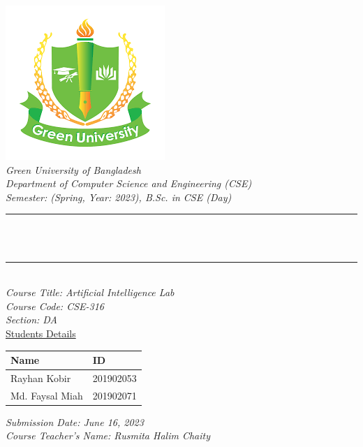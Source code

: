 \begin{titlepage}
\center 
\newcommand{\HRule}{\rule{\linewidth}{0.1mm}}
\includegraphics[scale=0.6]{images/GUB.png}\\[1cm] 
\center 
\textsl{\Large Green University of Bangladesh }\\[0.5cm] 
\textsl{\large Department of Computer Science and Engineering (CSE)}\\
\textsl{\large Semester: (Spring, Year: 2023), B.Sc. in CSE (Day)}\\[0.5cm] 
\makeatletter
\HRule \\[0.4cm]
{ \huge \bfseries \@title}\\[0.2cm] 
\HRule \\[1.0cm]

\textsl{\large Course Title: Artificial Intelligence Lab }\\
\textsl{\large Course Code: CSE-316 }\\ 
\textsl{\large Section: DA}\\[0.5cm] 

{\large \underline{Students Details}}\\[0.2cm]

\begin{table}[htb]
\centering
\begin{tabular}{ |P{7.0cm}|P{3.5cm}|}
\hline
\textbf{Name} & \textbf{ID}\\
\hline
Rayhan Kobir  & 201902053 \\
\hline
Md. Faysal Miah & 201902071 \\
\hline
\end{tabular}
\end{table}
\vspace{0.5cm}


\textsl{\large Submission Date: June 16, 2023 }\\ 
\textsl{\large Course Teacher’s Name: Rusmita Halim Chaity }\\[0.9cm] 





\end{titlepage}
